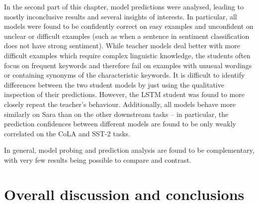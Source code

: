 \documentclass[bsc,frontabs,singlespacing,parskip,deptreport]{infthesis}
\begin{document}
{{    In the second part of this chapter, model predictions were analysed, leading to mostly inconclusive results and several insights of interests.
    In particular, all models were found to be confidently correct on easy examples and unconfident on unclear or difficult examples (such as when a sentence in sentiment classification does not have strong sentiment).
    While teacher models deal better with more difficult examples which require complex linguistic knowledge, the students often focus on frequent keywords and therefore fail on examples with unusual wordings or containing synonyms of the characteristic keywords.
    It is difficult to identify differences between the two student models by just using the qualitative inspection of their predictions.
    However, the LSTM student was found to more closely repeat the teacher's behaviour.
    Additionally, all models behave more similarly on Sara than on the other downstream tasks -- in particular, the prediction confidences between different models are found to be only weakly correlated on the CoLA and SST-2 tasks.

    In general, model probing and prediction analysis are found to be complementary, with very few results being possible to compare and contrast.
  }
}

\chapter{Overall discussion and conclusions}{
  
}
\end{document}
